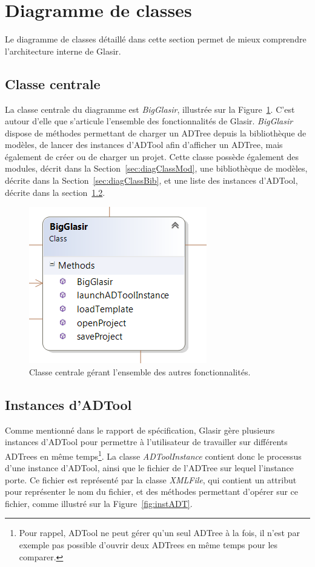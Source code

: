 \section{Diagramme de classes}
    \label{sec:diagClass}
    
    Le diagramme de classes détaillé dans cette section permet de mieux comprendre l'architecture interne de Glasir.
    
    \subsection{Classe centrale}
    	\label{sec:diagClassCentral}
    	La classe centrale du diagramme est \emph{BigGlasir}, illustrée sur la {\sc Figure}~\ref{fig:bigglasir}. C'est autour d'elle que s'articule l'ensemble des fonctionnalités de Glasir. \emph{BigGlasir} dispose de méthodes permettant de charger un ADTree depuis la bibliothèque de modèles, de lancer des instances d'ADTool afin d'afficher un ADTree, mais également de créer ou de charger un projet. Cette classe possède également des modules, décrit dans la {\sc Section}~{\ref{sec:diagClassMod}}, une bibliothèque de modèles, décrite dans la {\sc Section}~{\ref{sec:diagClassBib}}, et une liste des instances d'ADTool, décrite dans la {\sc section}~{\ref{sec:diagClassADT}}.
    	
    	\begin{figure}[H]
	        \centering
	        \includegraphics[height=0.3\textwidth]{figure/bigglasir.png}
	        \caption{Classe centrale gérant l'ensemble des autres fonctionnalités.}
	        \label{fig:bigglasir}
	    \end{figure}
    	
    \subsection{Instances d'ADTool}
    	\label{sec:diagClassADT}
    	
    	Comme mentionné dans le rapport de spécification, Glasir gère plusieurs instances d'ADTool pour permettre à l'utilisateur de travailler sur différents ADTrees en même temps\footnote{Pour rappel, ADTool ne peut gérer qu'un seul ADTree à la fois, il n'est par exemple pas possible d'ouvrir deux ADTrees en même temps pour les comparer.}. La classe \emph{ADToolInstance} contient donc le processus d'une instance d'ADTool, ainsi que le fichier de l'ADTree sur lequel l'instance porte. Ce fichier est représenté par la classe \emph{XMLFile}, qui contient un attribut pour représenter le nom du fichier, et des méthodes permettant d'opérer sur ce fichier, comme illustré sur la {\sc Figure}~\ref{fig:instADT}.
    	
